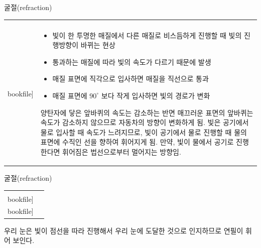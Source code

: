 \begin{frame}[t]{굴절(refraction)}
	\begin{tabular}{ll}
		\begin{minipage}[t]{0.4\textwidth}\scriptsize
			\begin{figure}[t]
				\texttt{[image: \\bookfile]}
			\end{figure}
		\end{minipage}	
		&
		\begin{minipage}[t]{0.55\textwidth} \scriptsize	
			\begin{itemize}
				\item 빛이 한 투명한 매질에서 다른 매질로 비스듬하게 진행할 때 빛의 진행방향이 바뀌는 현상
				\item 통과하는 매질에 따라 빛의 속도가 다르기 때문에 발생
				\item 매질 표면에 직각으로 입사하면 매질을 직선으로 통과
				\item 매질 표면에 $90^{\circ}$ 보다 작게 입사하면 빛의 경로가 변화
			\end{itemize}
	
			양탄자에 닿은 앞바퀴의 속도는 감소하는 반면 매끄러운 표면의 앞바퀴는 속도가 감소하지 않으므로 자동차의 방향이 변화하게 됨.
			빛은 공기에서 물로 입사할 때 속도가 느려지므로, 빛이 공기에서 물로 진행할 때 물의 표면에 수직인 선을 향하여 휘어지게 됨.
			만약, 빛이 물에서 공기로 진행한다면 휘어짐은 법선으로부터 멀어지는 방향임.

		\end{minipage}
	\end{tabular}
\end{frame}



\begin{frame}[t]{굴절(refraction)}
	\begin{tabular}{ll}
		\begin{minipage}[t]{0.475\textwidth}\scriptsize
			\begin{figure}[t]
				\texttt{[image: \\bookfile]}
			\end{figure}
		\end{minipage}	
		&
		\begin{minipage}[t]{0.475\textwidth} \scriptsize	
			\begin{figure}[t]
				\texttt{[image: \\bookfile]}
			\end{figure}
		\end{minipage}
	\end{tabular}
		
	\scriptsize
		우리 눈은 빛이 점선을 따라 진행해서 우리 눈에 도달한 것으로 인지하므로 연필이 휘어 보인다.
\end{frame}


